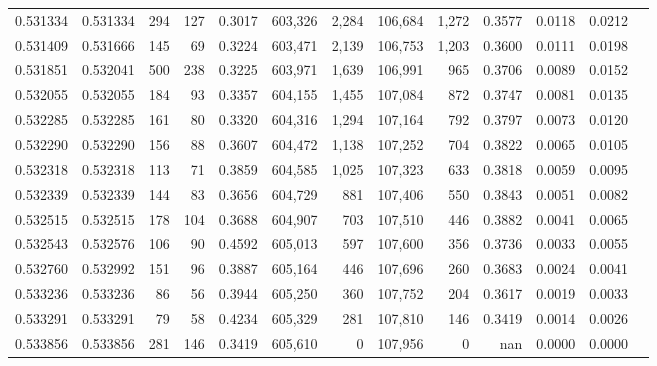 \begin{tabular}{rrrrrrrrrrrrr}
0.531334 & 0.531334 &   294 &   127 &                                     0.3017 & 603,326 &   2,284 & 106,684 &   1,272 & 0.3577 & 0.0118 & 0.0212 \\
0.531409 & 0.531666 &   145 &    69 &                                     0.3224 & 603,471 &   2,139 & 106,753 &   1,203 & 0.3600 & 0.0111 & 0.0198 \\
0.531851 & 0.532041 &   500 &   238 &                                     0.3225 & 603,971 &   1,639 & 106,991 &     965 & 0.3706 & 0.0089 & 0.0152 \\
0.532055 & 0.532055 &   184 &    93 &                                     0.3357 & 604,155 &   1,455 & 107,084 &     872 & 0.3747 & 0.0081 & 0.0135 \\
0.532285 & 0.532285 &   161 &    80 &                                     0.3320 & 604,316 &   1,294 & 107,164 &     792 & 0.3797 & 0.0073 & 0.0120 \\
0.532290 & 0.532290 &   156 &    88 &                                     0.3607 & 604,472 &   1,138 & 107,252 &     704 & 0.3822 & 0.0065 & 0.0105 \\
0.532318 & 0.532318 &   113 &    71 &                                     0.3859 & 604,585 &   1,025 & 107,323 &     633 & 0.3818 & 0.0059 & 0.0095 \\
0.532339 & 0.532339 &   144 &    83 &                                     0.3656 & 604,729 &     881 & 107,406 &     550 & 0.3843 & 0.0051 & 0.0082 \\
0.532515 & 0.532515 &   178 &   104 &                                     0.3688 & 604,907 &     703 & 107,510 &     446 & 0.3882 & 0.0041 & 0.0065 \\
0.532543 & 0.532576 &   106 &    90 &                                     0.4592 & 605,013 &     597 & 107,600 &     356 & 0.3736 & 0.0033 & 0.0055 \\
0.532760 & 0.532992 &   151 &    96 &                                     0.3887 & 605,164 &     446 & 107,696 &     260 & 0.3683 & 0.0024 & 0.0041 \\
0.533236 & 0.533236 &    86 &    56 &                                     0.3944 & 605,250 &     360 & 107,752 &     204 & 0.3617 & 0.0019 & 0.0033 \\
0.533291 & 0.533291 &    79 &    58 &                                     0.4234 & 605,329 &     281 & 107,810 &     146 & 0.3419 & 0.0014 & 0.0026 \\
0.533856 & 0.533856 &   281 &   146 &                                     0.3419 & 605,610 &       0 & 107,956 &       0 &    nan & 0.0000 & 0.0000 \\
\bottomrule
\end{tabular}
